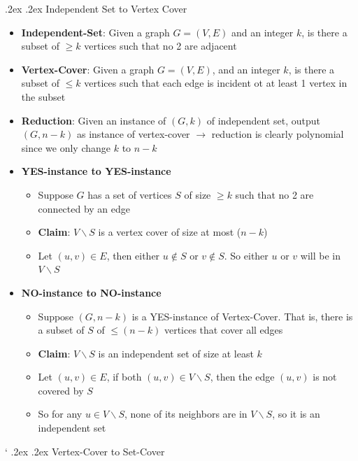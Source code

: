 \documentclass[10pt,landscape,a4paper]{article}
\makeatletter
\renewcommand{\subsection}{\@startsection{subsection}{1}{0mm}%
    {.2ex}%
    {.2ex}%
    {\sffamily\bfseries}}
\makeatother
\begin{document}
\begin{multicols*}{4}
	\subsection{Independent Set to Vertex Cover}
	\begin{itemize}
		\item \textbf{Independent-Set}: Given a graph $G=(V,E)$ and an integer $k$, is there a subset of $\geq k$ vertices such that no 2 are adjacent
		\item \textbf{Vertex-Cover}: Given a graph $G=(V,E)$, and an integer $k$, is there a subset of $\leq k$ vertices such that each edge is incident ot at least 1 vertex in the subset
		\item \textbf{Reduction}: Given an instance of $(G, k)$ of independent set, output $(G, n-k)$ as instance of vertex-cover $\rightarrow$ reduction is clearly polynomial since we only change $k$ to $n-k$
		\item  \textbf{YES-instance to YES-instance}
		      \begin{itemize}
			      \item Suppose $G$ has a set of vertices $S$ of size $\geq k$ such that no 2 are connected by an edge
			      \item \textbf{Claim}: $V \backslash S$ is a vertex cover of size at most ($n-k$)
			      \item Let $(u,v)\in E$, then either $u\notin S$ or $v\notin S$. So either $u$ or $v$ will be in $V \backslash S$
		      \end{itemize}
		\item \textbf{NO-instance to NO-instance}
		      \begin{itemize}
			      \item Suppose $(G, n-k)$ is a YES-instance of Vertex-Cover. That is, there is a subset of $S$ of $\leq (n-k)$ vertices that cover all edges
			      \item \textbf{Claim}: $V\backslash S$ is an independent set of size at least $k$
			      \item Let $(u,v)\in E$, if both $(u,v)\in V\backslash S$, then the edge $(u,v)$ is not covered by $S$
			      \item So for any $u\in V\backslash S$, none of its neighbors are in $V\backslash S$, so it is an independent set
		      \end{itemize}
	\end{itemize}
	`	\subsection{Vertex-Cover to Set-Cover}

\end{multicols*}
\end{document}
